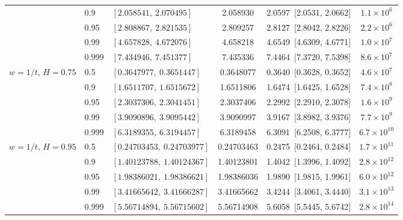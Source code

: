 \begin{tabular}{lllccc}
 & 0.9 & $[2.058541,\ 2.070495]$ & 2.058930 & 2.0597\ [2.0531, 2.0662] & $1.1\times10^{6}$\\
 & 0.95 & $[2.808867,\ 2.821535]$ & 2.809257 & 2.8127\ [2.8042, 2.8226] & $2.2\times10^{6}$\\
 & 0.99 & $[4.657828,\ 4.672076]$ & 4.658218 & 4.6549\ [4.6309, 4.6771] & $1.0\times10^{7}$\\
 & 0.999 & $[7.434946,\ 7.451377]$ & 7.435336 & 7.4464\ [7.3720, 7.5398] & $8.6\times10^{7}$\\
\addlinespace
$w=1/t$, $H=0.75$ & 0.5 & $[0.3647977,\ 0.3651447]$ & 0.3648077 & 0.3640\ [0.3628, 0.3652] & $4.6\times10^{7}$\\
 & 0.9 & $[1.6511707,\ 1.6515672]$ & 1.6511806 & 1.6474\ [1.6425, 1.6528] & $7.4\times10^{8}$\\
 & 0.95 & $[2.3037306,\ 2.3041451]$ & 2.3037406 & 2.2992\ [2.2910, 2.3078] & $1.6\times10^{9}$\\
 & 0.99 & $[3.9090896,\ 3.9095442]$ & 3.9090997 & 3.9167\ [3.8982, 3.9376] & $7.7\times10^{9}$\\
 & 0.999 & $[6.3189355,\ 6.3194457]$ & 6.3189458 & 6.3091\ [6.2508, 6.3777] & $6.7\times10^{10}$\\
\addlinespace
$w=1/t$, $H=0.95$ & 0.5 & $[0.24703453,\ 0.24703977]$ & 0.24703463 & 0.2475\ [0.2464, 0.2484] & $1.7\times10^{11}$\\
 & 0.9 & $[1.40123788,\ 1.40124367]$ & 1.40123801 & 1.4042\ [1.3996, 1.4092] & $2.8\times10^{12}$\\
 & 0.95 & $[1.98386021,\ 1.98386621]$ & 1.98386036 & 1.9890\ [1.9815, 1.9961] & $6.0\times10^{12}$\\
 & 0.99 & $[3.41665642,\ 3.41666287]$ & 3.41665662 & 3.4244\ [3.4061, 3.4440] & $3.1\times10^{13}$\\
 & 0.999 & $[5.56714894,\ 5.56715602]$ & 5.56714908 & 5.6058\ [5.5445, 5.6742] & $2.8\times10^{14}$\\
\bottomrule\end{tabular}

